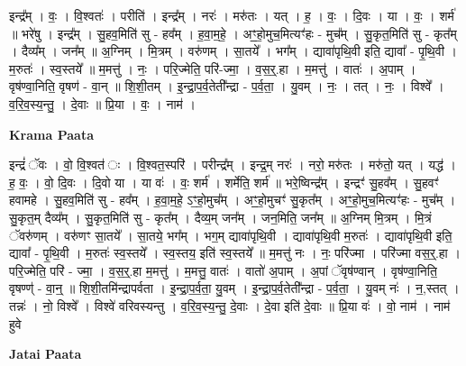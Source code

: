 \documentclass[17pt]{extarticle}
\begin{document}
इन्द्र᳚म् । वः॒ । वि॒श्वतः॑ । परीति॑ । इन्द्र᳚म् । नरः॑ । मरु॑तः । यत् । ह॒ । वः॒ । दि॒वः । या । वः॒ । शर्म॑ ॥ भरे॑षु । इन्द्र᳚म् । सु॒हव॒मिति॑ सु - हव᳚म् । ह॒वा॒म॒हे॒ । अꣳ॒॒हो॒मुच॒मित्यꣳ॑हः - मुच᳚म् । सु॒कृत॒मिति॑ सु - कृत᳚म् । दैव्य᳚म् । जन᳚म् ॥ अ॒ग्निम् । मि॒त्रम् । वरु॑णम् । सा॒तये᳚ । भग᳚म् । द्यावा॑पृथि॒वी इति॒ द्यावा᳚ - पृ॒थि॒वी । म॒रुतः॑ । स्व॒स्तये᳚ ॥ म॒मत्तु॑ । नः॒ । परि॒ज्मेति॒ परि॑-ज्मा॒ । व॒स॒र्॒.हा । म॒मत्तु॑ । वातः॑ । अ॒पाम् । वृष॑ण्वा॒निति॒ वृषण॑ - वा॒न् ॥ शि॒शी॒तम् । इ॒न्द्रा॒प॒र्व॒तेती᳚न्द्रा - प॒र्व॒ता॒ । यु॒वम् । नः॒ । तत् । नः॒ । विश्वे᳚ । व॒रि॒व॒स्य॒न्तु॒ । दे॒वाः ॥ प्रि॒या । वः॒ । नाम॑ ।  \newline


\textbf{Krama Paata} \newline

इन्द्रं॑ ॅवः । वो॒ वि॒श्वत॑ ः । वि॒श्वत॒स्परि॑ । परीन्द्र᳚म् । इन्द्र॒म् नरः॑ । नरो॒ मरु॑तः । मरु॑तो॒ यत् । यद्ध॑ । ह॒ वः॒ । वो॒ दि॒वः । दि॒वो या । या वः॑ । वः॒ शर्म॑ । शर्मेति॒ शर्म॑ ॥ भरे॒ष्विन्द्र᳚म् । इन्द्रꣳ॑ सु॒हव᳚म् । सु॒हवꣳ॑ हवामहे । सु॒हव॒मिति॑ सु - हव᳚म् । ह॒वा॒म॒हे॒ ऽꣳ॒हो॒मुच᳚म् । अꣳ॒॒हो॒मुचꣳ॑ सु॒कृत᳚म् । अꣳ॒॒हो॒मुच॒मित्यꣳ॑हः - मुच᳚म् । सु॒कृत॒म् दैव्य᳚म् । सु॒कृत॒मिति॑ सु - कृत᳚म् । दैव्य॒म् जन᳚म् । जन॒मिति॒ जन᳚म् ॥ अ॒ग्निम् मि॒त्रम् । मि॒त्रं ॅवरु॑णम् । वरु॑णꣳ सा॒तये᳚ । सा॒तये॒ भग᳚म् । भग॒म् द्यावा॑पृथि॒वी । द्यावा॑पृथि॒वी म॒रुतः॑ । द्यावा॑पृथि॒वी इति॒ द्यावा᳚ - पृ॒थि॒वी । म॒रुतः॑ स्व॒स्तये᳚ । स्व॒स्तय॒ इति॑ स्व॒स्तये᳚ ॥ म॒मत्तु॑ नः । नः॒ परि॑ज्मा । परि॑ज्मा वस॒र्॒.हा । परि॒ज्मेति॒ परि॑ - ज्मा॒ । व॒स॒र्॒.हा म॒मत्तु॑ । म॒मत्तु॒ वातः॑ । वातो॑ अ॒पाम् । अ॒पां ॅवृष॑ण्वान् । वृष॑ण्वा॒निति॒ वृषण्ण्॑ - वा॒न्॒ ॥ शि॒शी॒तमि॑न्द्रापर्वता । इ॒न्द्रा॒प॒र्व॒ता॒ यु॒वम् । इ॒न्द्रा॒प॒र्व॒तेती᳚न्द्रा - प॒र्व॒ता॒ । यु॒वम् नः॑ । न॒,स्तत् । तन्नः॑ । नो॒ विश्वे᳚ । विश्वे॑ वरिवस्यन्तु । व॒रि॒व॒स्य॒न्तु॒ दे॒वाः । दे॒वा इति॑ दे॒वाः ॥ प्रि॒या वः॑ । वो॒ नाम॑ । नाम॑ हुवे \newline

\textbf{Jatai Paata} \newline
\end{document}
